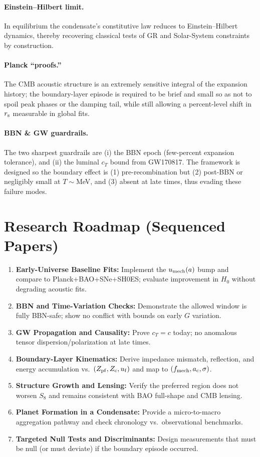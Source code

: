 \documentclass[11pt,a4paper]{article}
\newcommand{\ac}{a_{\rm c}}
\newcommand{\rs}{r_{\rm s}}
\begin{document}
\paragraph{Einstein–Hilbert limit.} In equilibrium the condensate’s constitutive law reduces to Einstein–Hilbert dynamics, thereby recovering classical tests of GR and Solar-System constraints by construction. 
\paragraph{Planck ``proofs.''} The CMB acoustic structure is an extremely sensitive integral of the expansion history; the boundary-layer episode is required to be brief and small so as not to spoil peak phases or the damping tail, while still allowing a percent-level shift in $\rs$ measurable in global fits.
\paragraph{BBN \& GW guardrails.} The two sharpest guardrails are (i) the BBN epoch (few-percent expansion tolerance), and (ii) the luminal $c_T$ bound from GW170817. The framework is designed so the boundary effect is (1) pre-recombination but (2) post-BBN or negligibly small at $T\!\sim$MeV, and (3) absent at late times, thus evading these failure modes.

\section{Research Roadmap (Sequenced Papers)}
\begin{enumerate}[leftmargin=2.2em]
\item \textbf{Early-Universe Baseline Fits:} Implement the $u_{\rm mech}(a)$ bump and compare to Planck+BAO+SNe+SH0ES; evaluate improvement in $H_0$ without degrading acoustic fits.
\item \textbf{BBN and Time-Variation Checks:} Demonstrate the allowed window is fully BBN-safe; show no conflict with bounds on early $G$ variation.
\item \textbf{GW Propagation and Causality:} Prove $c_T=c$ today; no anomalous tensor dispersion/polarization at late times.
\item \textbf{Boundary-Layer Kinematics:} Derive impedance mismatch, reflection, and energy accumulation vs.\ $(Z_{\rm pf},Z_{\rm c},u_{\rm f})$ and map to $(f_{\rm mech},\ac,\sigma)$.
\item \textbf{Structure Growth and Lensing:} Verify the preferred region does not worsen $S_8$ and remains consistent with BAO full-shape and CMB lensing.
\item \textbf{Planet Formation in a Condensate:} Provide a micro-to-macro aggregation pathway and check chronology vs.\ observational benchmarks.
\item \textbf{Targeted Null Tests and Discriminants:} Design measurements that must be null (or must deviate) if the boundary episode occurred.
\end{enumerate}
\end{document}
